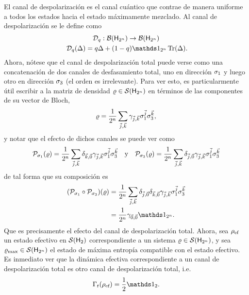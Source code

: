 El canal de despolarización es el canal cuántico que contrae de manera uniforme a todos los estados hacia el estado máximamente mezclado. Al canal de despolarización se le define como
\begin{gather}\label{eq:DepolarizingChannelN}
    \mcD_{q}:\mcB(\hilbert_{2^{n}}) \rightarrow \mcB(\hilbert_{2^{n}})\nonumber\\
    \mcD_{q}(\Delta)=q\Delta+(1-q)\Id_{2^{n}}\Tr(\Delta)\rlap{.}
\end{gather}
Ahora, nótese que el canal de despolarización total puede verse como una concatenación de dos canales de desfasamiento total, uno en dirección $\sigma_{1}$ y luego otro en dirección $\sigma_{3}$ (el orden es irrelevante). Para ver esto, es particularmente útil escribir a la matriz de densidad $\varrho\in\mathcal{S}({\sf H}_{2^{n}})$ en términos de las componentes de su vector de Bloch,
\begin{equation}
    \varrho=\frac{1}{2^{n}}\sum_{\vec{j},\vec{k}}\gamma_{\vec{j},\vec{k}}\sigma_{1}^{\vec{j}}\sigma_{3}^{\vec{k}},\nonumber
\end{equation}
y notar que el efecto de dichos canales se puede ver como
\begin{align}
    \mathcal{P}_{\sigma_{1}}(\varrho)=\frac{1}{2^{n}}\sum_{\vec{j},\vec{k}}\delta_{\vec{k},\vec{0}}\gamma_{\vec{j},\vec{k}}\sigma_{1}^{\vec{j}}\sigma_{3}^{\vec{k}}  & & \text{y} & & \mathcal{P}_{\sigma_{3}}(\varrho)=\frac{1}{2^{n}}\sum_{\vec{j},\vec{k}}\delta_{\vec{j},\vec{0}}\gamma_{\vec{j},\vec{k}}\sigma_{1}^{\vec{j}}\sigma_{3}^{\vec{k}} \nonumber
\end{align}
de tal forma que su composición es
\begin{align}
    \qty(\mcP_{\pauli{1}}\circ \mcP_{\pauli{3}})(\varrho)&=\frac{1}{2^{n}}\sum_{\vec{j},\vec{k}}\delta_{\vec{j},\vec{0}}\delta_{\vec{k},\vec{0}}\gamma_{\vec{j},\vec{k}}\pauli{1}^{\vec{j}}\pauli{3}^{\vec{k}}\nonumber\\
    &=\frac{1}{2^{n}}\gamma_{\vec{0},\vec{0}}\Id_{2^{n}}.\nonumber
\end{align}
Que es precisamente el efecto del canal de despolarización total. Ahora, sea $\rho_{\text{ef}}$ un estado efectivo en $\mathcal{S}({\sf H}_{2})$ correspondiente a un sistema $\varrho \in \mathcal{S}({\sf H}_{2^{n}})$, y sea $\varrho_{\max}\in\mathcal{S}({\sf H}_{2^{n}})$ el estado de máxima entropía compatible con el estado efectivo. Es inmediato ver que la dinámica efectiva correspondiente a un canal de despolarización total es otro canal de despolarización total, i.e.
\begin{equation}
    \Gamma_{t}(\rho_{\ef})=\frac{1}{2}\Id_{2}.
\end{equation}
